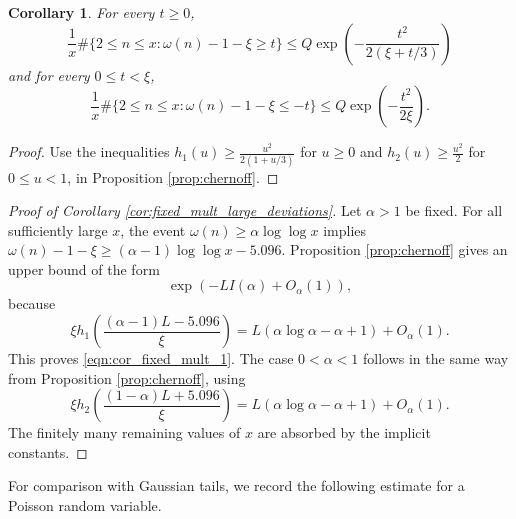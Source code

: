\documentclass[12pt,a4paper,reqno]{amsart}
\theoremstyle{plain}
\newtheorem{crllry}[thrm]{Corollary}
\numberwithin{sblmm}{thrm}
\numberwithin{equation}{section}
\begin{document}
\begin{crllry}\label{cor:bernstein}
    For every $t\ge 0$,
    $$\frac{1}{x}\#\{2\le n\le x:\omega(n)-1-\xi\ge t\}\le Q\exp\left(-\frac{t^2}{2(\xi+t/3)}\right)$$
    and for every $0\le t<\xi$,
    $$\frac{1}{x}\#\{2\le n\le x:\omega(n)-1-\xi\le -t\}\le Q\exp\left(-\frac{t^2}{2\xi}\right).$$
\end{crllry}
\begin{proof}
    Use the inequalities $h_1(u)\ge\frac{u^2}{2(1+u/3)}$ for $u\ge 0$ and $h_2(u)\ge\frac{u^2}{2}$ for $0\le u<1$, in Proposition \ref{prop:chernoff}.
\end{proof}

\begin{proof}[Proof of Corollary \ref{cor:fixed_mult_large_deviations}]
    Let $\alpha>1$ be fixed. For all sufficiently large $x$, the event $\omega(n)\ge\alpha\log\log x$ implies $\omega(n)-1-\xi\ge(\alpha-1)\log\log x-5.096$. Proposition \ref{prop:chernoff} gives an upper bound of the form
    $$\exp(-L I(\alpha)+O_{\alpha}(1)),$$
    because
    $$\xi h_1\left(\frac{(\alpha-1)L-5.096}{\xi}\right)=L(\alpha\log\alpha-\alpha+1)+O_{\alpha}(1).$$
    This proves \eqref{eqn:cor_fixed_mult_1}. The case $0<\alpha<1$ follows in the same way from Proposition \ref{prop:chernoff}, using
    $$\xi h_2\left(\frac{(1-\alpha)L+5.096}{\xi}\right)=L(\alpha\log\alpha-\alpha+1)+O_{\alpha}(1).$$
    The finitely many remaining values of $x$ are absorbed by the implicit constants.
\end{proof}

For comparison with Gaussian tails, we record the following estimate for a Poisson random variable.
\end{document}
